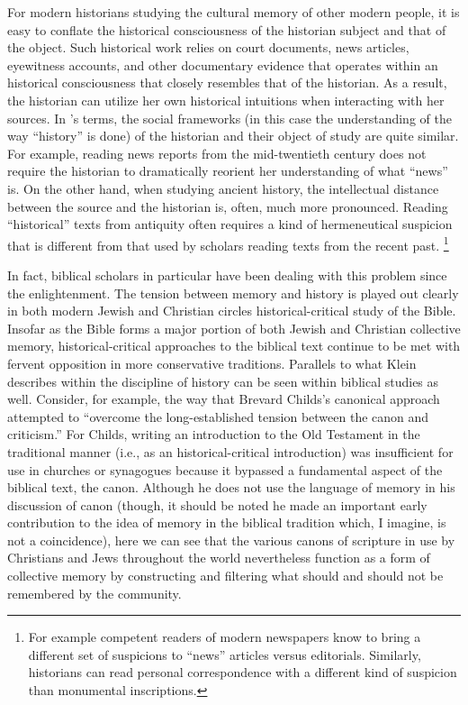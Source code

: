 For modern historians studying the cultural memory of other modern people, it is easy to conflate the historical consciousness of the historian subject and that of the object. Such historical work relies on court documents, news articles, eyewitness accounts, and other documentary evidence that operates within an historical consciousness that closely resembles that of the historian. As a result, the historian can utilize her own historical intuitions when interacting with her sources. In \halbwachs's terms, the social frameworks (in this case the understanding of the way ``history'' is done) of the historian and their object of study are quite similar. For example, reading news reports from the mid-twentieth century does not require the historian to dramatically reorient her understanding of what ``news'' is. On the other hand, when studying ancient history, the intellectual distance between the source and the historian is, often, much more pronounced. Reading ``historical'' texts from antiquity often requires a kind of hermeneutical suspicion that is different from that used by scholars reading texts from the recent past.%
%
\footnote{For example competent readers of modern newspapers know to bring a different set of suspicions to ``news'' articles versus editorials. Similarly, historians can read personal correspondence with a different kind of suspicion than monumental inscriptions.}

In fact, biblical scholars in particular have been dealing with this problem since the enlightenment. The tension between memory and history is played out clearly in both modern Jewish and Christian circles \visavis historical-critical study of the Bible. Insofar as the Bible forms a major portion of both Jewish and Christian collective memory, historical-critical approaches to the biblical text continue to be met with fervent opposition in more conservative traditions. Parallels to what Klein describes within the discipline of history can be seen within biblical studies as well. Consider, for example, the way that Brevard Childs's canonical approach attempted to ``overcome the long-established tension between the canon and criticism.''\autocite[45]{childs1979} For Childs, writing an introduction to the Old Testament in the traditional manner (i.e., as an historical-critical introduction) was insufficient for use in churches or synagogues because it bypassed a fundamental aspect of the biblical text, the canon. Although he does not use the language of memory in his discussion of canon (though, it should be noted he made an important early contribution to the idea of memory in the biblical tradition which, I imagine, is not a coincidence\autocite{childs1962}), here we can see that the various canons of scripture in use by Christians and Jews throughout the world nevertheless function as a form of collective memory by constructing and filtering what should and should not be remembered by the community.  

